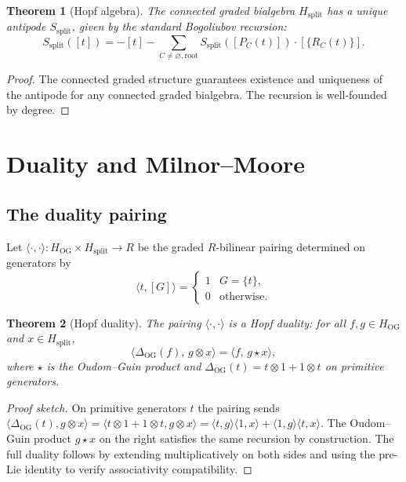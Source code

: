 \documentclass[11pt]{article}
\newtheorem{theorem}{Theorem}
\begin{document}
\begin{theorem}[Hopf algebra]\label{thm:hsplit-hopf}
The connected graded bialgebra $H_{\mathrm{split}}$ has a unique antipode $S_{\mathrm{split}}$, given by the standard Bogoliubov recursion:
\[
S_{\mathrm{split}}([t]) = -[t] - \sum_{C\neq\varnothing,\mathrm{root}} S_{\mathrm{split}}([P_C(t)])\cdot[\{R_C(t)\}].
\]
\end{theorem}

\begin{proof}
The connected graded structure guarantees existence and uniqueness of the antipode for any connected graded bialgebra.  The recursion is well-founded by degree.
\end{proof}

\section{Duality and Milnor--Moore}

\subsection{The duality pairing}

Let $\langle\cdot,\cdot\rangle:H_{\mathrm{OG}}\times H_{\mathrm{split}}\to R$ be the graded $R$-bilinear pairing determined on generators by
\[
\langle t, [G]\rangle = \begin{cases} 1 & G=\{t\},\\ 0 & \text{otherwise.}\end{cases}
\]

\begin{theorem}[Hopf duality]\label{thm:duality}
The pairing $\langle\cdot,\cdot\rangle$ is a Hopf duality: for all $f,g\in H_{\mathrm{OG}}$ and $x\in H_{\mathrm{split}}$,
\[
\langle\Delta_{\mathrm{OG}}(f),\,g\otimes x\rangle
=
\langle f,\,g\star x\rangle,
\]
where $\star$ is the Oudom--Guin product and $\Delta_{\mathrm{OG}}(t)=t\otimes 1+1\otimes t$ on primitive generators.
\end{theorem}

\begin{proof}[Proof sketch]
On primitive generators $t$ the pairing sends $\langle\Delta_{\mathrm{OG}}(t),g\otimes x\rangle = \langle t\otimes 1+1\otimes t,g\otimes x\rangle = \langle t,g\rangle\langle 1,x\rangle + \langle 1,g\rangle\langle t,x\rangle$.  The Oudom--Guin product $g\star x$ on the right satisfies the same recursion by construction.  The full duality follows by extending multiplicatively on both sides and using the pre-Lie identity to verify associativity compatibility.
\end{proof}
\end{document}
